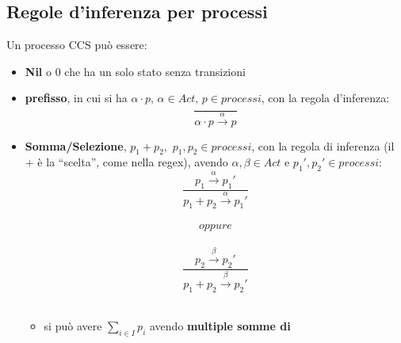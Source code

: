 \subsection{Regole d'inferenza per processi}
Un processo CCS può essere:
\begin{itemize}
  \item \textbf{Nil} o $0$ che ha un solo stato senza transizioni
  \begin{center}
  \end{center}
  \item \textbf{prefisso}, in cui si ha $\alpha\cdot p,\,\alpha\in Act,\, p\in
  processi$, con la regola d'inferenza:
  \[\frac{}{\alpha\cdot p\stackrel{\alpha}{\rightarrow}p}\]
  \begin{center}
  \end{center}
  \item \textbf{Somma/Selezione}, $p_1+p_2,\,\, p_1, p_2\in processi$, con la regola di
  inferenza (il $+$ è la ``scelta'', come nella regex), avendo $\alpha,\beta\in
  Act$ e $p_1', p_2'\in processi$:
  \[\frac{p_1\stackrel{\alpha}{\rightarrow}p_1'}{p_1+p_2
      \stackrel{\alpha}{\rightarrow}p_1'}\] \\
  \[oppure\]\\
   \[\frac{p_2\stackrel{\beta}{\rightarrow}p_2'}{p_1+p_2
       \stackrel{\beta}{\rightarrow}p_2'}\]\\
   \begin{center}
  \end{center}
  \begin{itemize}
  \item si può avere $\sum_{i\in I}p_i$ avendo \textbf{multiple somme di
}
\end{itemize}
\end{itemize}

